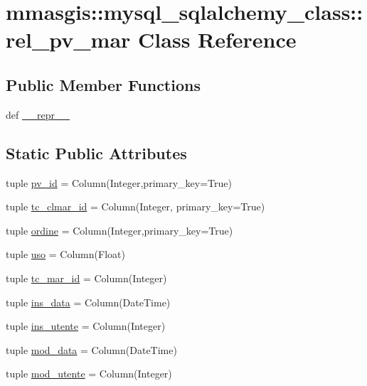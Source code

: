 \hypertarget{classmmasgis_1_1mysql__sqlalchemy__class_1_1rel__pv__mar}{
\section{mmasgis::mysql\_\-sqlalchemy\_\-class::rel\_\-pv\_\-mar Class Reference}
\label{classmmasgis_1_1mysql__sqlalchemy__class_1_1rel__pv__mar}
}
\subsection*{Public Member Functions}
\begin{DoxyCompactItemize}
\item 
def \hyperlink{classmmasgis_1_1mysql__sqlalchemy__class_1_1rel__pv__mar_a5b6324a2b55c3c464595185e17558687}{\_\-\_\-repr\_\-\_\-}
\end{DoxyCompactItemize}
\subsection*{Static Public Attributes}
\begin{DoxyCompactItemize}
\item 
tuple \hyperlink{classmmasgis_1_1mysql__sqlalchemy__class_1_1rel__pv__mar_a3050dac9d4d049ca8af06472c5d00aa3}{pv\_\-id} = Column(Integer,primary\_\-key=True)
\item 
tuple \hyperlink{classmmasgis_1_1mysql__sqlalchemy__class_1_1rel__pv__mar_af1b4ade28cdec76a32a638f17d161290}{tc\_\-clmar\_\-id} = Column(Integer, primary\_\-key=True)
\item 
tuple \hyperlink{classmmasgis_1_1mysql__sqlalchemy__class_1_1rel__pv__mar_aa64e406aba066279966755f95b78c55b}{ordine} = Column(Integer,primary\_\-key=True)
\item 
tuple \hyperlink{classmmasgis_1_1mysql__sqlalchemy__class_1_1rel__pv__mar_a3b210e17b95c314990999ff35601cbc1}{uso} = Column(Float)
\item 
tuple \hyperlink{classmmasgis_1_1mysql__sqlalchemy__class_1_1rel__pv__mar_a1dd3a942d6f45bf240397cdf80aa8340}{tc\_\-mar\_\-id} = Column(Integer)
\item 
tuple \hyperlink{classmmasgis_1_1mysql__sqlalchemy__class_1_1rel__pv__mar_ae4b4f2d17df6a3421cd68c879412d54b}{ins\_\-data} = Column(DateTime)
\item 
tuple \hyperlink{classmmasgis_1_1mysql__sqlalchemy__class_1_1rel__pv__mar_ab39ed823811ed880d467d92ff27adc73}{ins\_\-utente} = Column(Integer)
\item 
tuple \hyperlink{classmmasgis_1_1mysql__sqlalchemy__class_1_1rel__pv__mar_ada2154b88331c2a3de1b09e8cf391d61}{mod\_\-data} = Column(DateTime)
\item 
tuple \hyperlink{classmmasgis_1_1mysql__sqlalchemy__class_1_1rel__pv__mar_a577d313c49e770e98f2e9b39a57cd202}{mod\_\-utente} = Column(Integer)
\end{DoxyCompactItemize}
